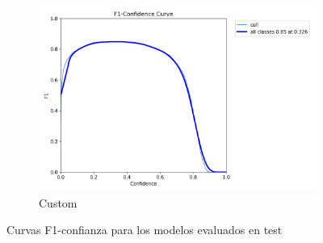 \documentclass[12pt,a4paper,onecolumn,oneside]{report}
\begin{document}
\begin{figure}[H]
  \vspace{0.5cm}
  \begin{subfigure}[b]{0.48\textwidth}
    \centering
    \includegraphics[width=\textwidth]{figuras/resultados experimentacion/custom/test/BoxF1_curve.png}
    \caption{Custom}
    \label{fig:custom_test}
  \end{subfigure}
  
  \caption{Curvas F1-confianza para los modelos evaluados en test}
  \label{fig:f1_curves_test}
\end{figure}
\end{document}
